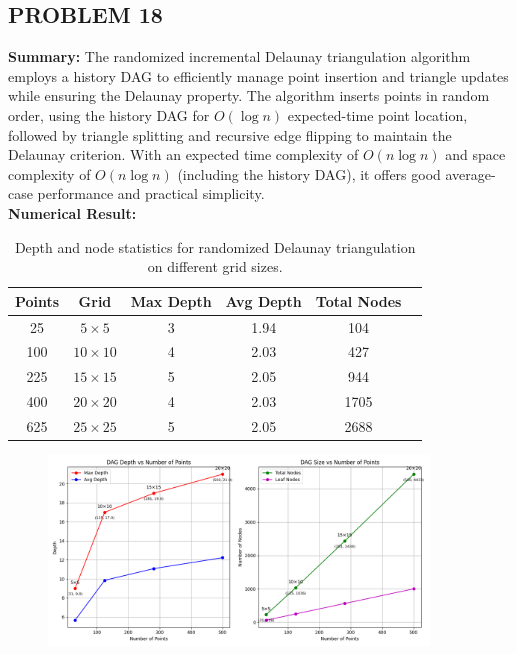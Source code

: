 \documentclass{article}
\begin{document}
\newpage

\subsection*{PROBLEM 18}

\textbf{Summary: }
The randomized incremental Delaunay triangulation algorithm employs a history DAG to efficiently manage point insertion and triangle updates while ensuring the Delaunay property. 
The algorithm inserts points in random order, using the history DAG for \(O(\log n)\) expected-time point location, followed by triangle splitting and recursive edge flipping to maintain the Delaunay criterion. 
With an expected time complexity of \(O(n \log n)\) and space complexity of \(O(n \log n)\) (including the history DAG), it offers good average-case performance and practical simplicity.
\\
\textbf{Numerical Result: }
\\
\begin{table}[h!]
    \centering
    \begin{tabular}{@{}cccccc@{}}
    \toprule
    \textbf{Points} & \textbf{Grid} & \textbf{Max Depth} & \textbf{Avg Depth} & \textbf{Total Nodes} \\ \midrule
    25  & \(5 \times 5\)   & 3 & 1.94 & 104  \\
    100 & \(10 \times 10\) & 4 & 2.03 & 427  \\
    225 & \(15 \times 15\) & 5 & 2.05 & 944  \\
    400 & \(20 \times 20\) & 4 & 2.03 & 1705 \\
    625 & \(25 \times 25\) & 5 & 2.05 & 2688 \\ \bottomrule
    \end{tabular}
    \caption{Depth and node statistics for randomized Delaunay triangulation on different grid sizes.}
    \label{tab:numerical-results}
    \end{table}

\begin{figure}[h]
    \centering
    \includegraphics[width=0.9\textwidth]{Figure_1.png}
    \label{fig:model}
\end{figure}
\end{document}

